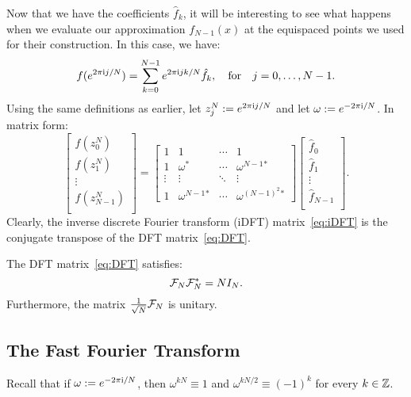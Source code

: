 Now that we have the coefficients $\hat{f}_k$, it will be interesting to see what happens when we evaluate our approximation $f_{N-1}(x)$ at the equispaced points we used for their construction. In this case, we have:
\begin{equation}
f(e^{2\pi{\rm i} j/N}) = \sum_{k=0}^{N-1} e^{2\pi{\rm i} jk/N} \hat{f}_k,\quad{\rm for}\quad j=0,\ldots,N-1.
\end{equation}
Using the same definitions as earlier, let $z_j^N := e^{2\pi{\rm i} j/N}$ and let $\omega := e^{-2\pi{\rm i}/N}$. In matrix form:
\begin{equation}\label{eq:iDFT}
\begin{bmatrix} f(z_0^N)\\ f(z_1^N)\\ \vdots\\ f(z_{N-1}^N)\\\end{bmatrix}
=
\begin{bmatrix}
1 & 1 & \cdots & 1\\
1 & \omega^* & \cdots & \omega^{N-1}{}^*\\
\vdots & \vdots & \ddots & \vdots\\
1 & \omega^{N-1}{}^* & \cdots & \omega^{(N-1)^2}{}^*
\end{bmatrix}
\begin{bmatrix} \hat{f}_0\\ \hat{f}_1\\ \vdots\\ \hat{f}_{N-1}\\\end{bmatrix}.
\end{equation}
Clearly, the inverse discrete Fourier transform (iDFT) matrix~\eqref{eq:iDFT} is the conjugate transpose of the DFT matrix~\eqref{eq:DFT}.
\begin{theorem}
The DFT matrix~\eqref{eq:DFT} satisfies:
\[
\mathcal{F}_N\mathcal{F}_N^* = NI_N.
\]
Furthermore, the matrix $\tfrac{1}{\sqrt{N}}\mathcal{F}_N$ is unitary.
\end{theorem}

\subsection{The Fast Fourier Transform}

Recall that if $\omega := e^{-2\pi{\rm i}/N}$, then $\omega^{kN} \equiv 1$ and $\omega^{kN/2} \equiv (-1)^k$ for every $k\in\mathbb{Z}$.

